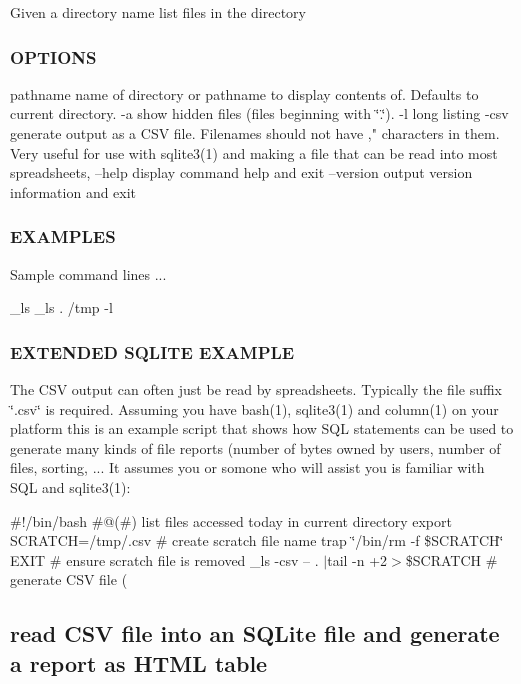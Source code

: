 Given a directory name list files in the directory \subsubsection*{O\+P\+T\+I\+O\+NS}

pathname name of directory or pathname to display contents of. Defaults to current directory. -\/a show hidden files (files beginning with \char`\"{}.\char`\"{}). -\/l long listing -\/csv generate output as a C\+SV file. Filenames should not have ,"\textquotesingle{} characters in them. Very useful for use with sqlite3(1) and making a file that can be read into most spreadsheets, --help display command help and exit --version output version information and exit \subsubsection*{E\+X\+A\+M\+P\+L\+ES}

Sample command lines ... \begin{DoxyVerb}   _ls
   _ls . /tmp -l
\end{DoxyVerb}


\subsubsection*{E\+X\+T\+E\+N\+D\+ED S\+Q\+L\+I\+TE E\+X\+A\+M\+P\+LE}

The C\+SV output can often just be read by spreadsheets. Typically the file suffix \char`\"{}.\+csv\char`\"{} is required. Assuming you have bash(1), sqlite3(1) and column(1) on your platform this is an example script that shows how S\+QL statements can be used to generate many kinds of file reports (number of bytes owned by users, number of files, sorting, ... It assumes you or somone who will assist you is familiar with S\+QL and sqlite3(1)\+:

\#!/bin/bash \#@(\#) list files accessed today in current directory export S\+C\+R\+A\+T\+CH=/tmp/.csv \# create scratch file name trap \char`\"{}/bin/rm -\/f \$\+S\+C\+R\+A\+T\+C\+H\char`\"{} E\+X\+IT \# ensure scratch file is removed \+\_\+ls -\/csv -- . $\vert$tail -\/n +2$>$\$\+S\+C\+R\+A\+T\+CH \# generate C\+SV file ( \subsection*{read C\+SV file into an S\+Q\+Lite file and generate a report as H\+T\+ML table}

